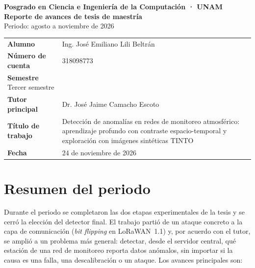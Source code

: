\documentclass[11pt, letterpaper]{article}
\begin{document}
\begin{center}
  {\large\bfseries Posgrado en Ciencia e Ingeniería de la Computación · UNAM}\\[4pt]
  {\Large\bfseries Reporte de avances de tesis de maestría}\\[2pt]
  {\large Periodo: agosto a noviembre de 2026}
\end{center}

\medskip
\noindent
\begin{tabularx}{\linewidth}{@{}l Y@{}}
  \toprule
  \textbf{Alumno} & Ing. José Emiliano Lili Beltrán \\
  \textbf{Número de cuenta} & 318098773 \\
  \textbf{Semestre} Tercer semestre \\
  \textbf{Tutor principal} & Dr. José Jaime Camacho Escoto \\
  \textbf{Título de trabajo} & Detección de anomalías en redes de monitoreo atmosférico:
    aprendizaje profundo con contraste espacio-temporal y exploración con imágenes
    sintéticas TINTO \\
  \textbf{Fecha} & 24 de noviembre de 2026 \\
  \bottomrule
\end{tabularx}

\tableofcontents

\section{Resumen del periodo}

Durante el periodo se completaron las dos etapas experimentales de la tesis y se cerró la
elección del detector final. El trabajo partió de un ataque concreto a la capa de
comunicación (\emph{bit flipping} en LoRaWAN~1.1) y, por acuerdo con el tutor, se amplió a
un problema más general: detectar, desde el servidor central, qué estación de una red de
monitoreo reporta datos anómalos, sin importar si la causa es una falla, una
descalibración o un ataque. Los avances principales son:
\end{document}
